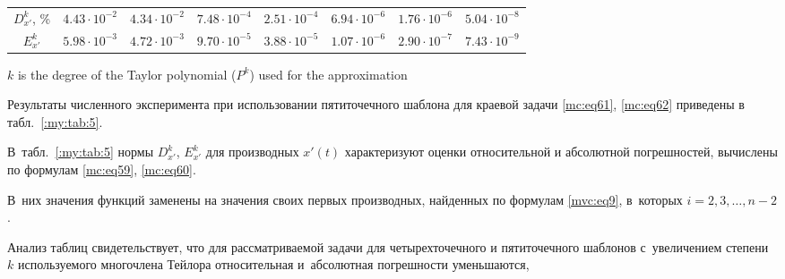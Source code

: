 \begin{table}
\begin{minipage}{.92\textwidth}
\begin{tabular}{c|c|c|c|c|c|c|c}
 \hline

\rule{0mm}{10pt}%


$D_{x'}^k$, \% & $4.43 \cdot {10^{-2}}$ & $4.34 \cdot {10^{-2}}$ & $7.48 \cdot {10^{-4}}$ & $2.51 \cdot {10^{-4}}$   &  $6.94 \cdot {10^{-6}}$ & $1.76 \cdot {10^{-6}}$ & $5.04 \cdot {10^{-8}}$ \\

$E_{x'}^k$  & $5.98 \cdot {10^{-3}}$ & $4.72 \cdot {10^{-3}}$ & $9.70 \cdot {10^{-5}}$ & $3.88 \cdot {10^{-5}}$  & $1.07 \cdot {10^{-6}}$ & $2.90 \cdot {10^{-7}}$ & $7.43 \cdot {10^{-9}}$  \\ 

\hline



\end{tabular}



\vspace{0.2cm}

\footnotesize



$k$ is the degree of the Taylor polynomial ($P^k$) used for the approximation





\end{minipage}





\end{table}







Результаты численного эксперимента при использовании пятиточечного шаблона для краевой задачи \eqref{mc:eq61}, \eqref{mc:eq62} приведены в табл.~\ref{:my:tab:5}.



В~табл.~\ref{:my:tab:5} нормы  $   D_{x'}^k$,    $   E_{x'}^k$  для производных $   x'(t)$  характеризуют  оценки относительной и абсолютной погрешностей, вычислены по формулам \eqref{mc:eq59}, \eqref{mc:eq60}.  

В~них значения функций заменены на значения своих первых производных, найденных по формулам \eqref{mvc:eq9}, в~которых $i=2,  3,  \dots,  n-2$.





Анализ таблиц свидетельствует, что для рассматриваемой задачи для четырехточечного и пятиточечного шаблонов с~увеличением степени $k$ используемого многочлена Тейлора относительная и~абсолютная  погрешности уменьшаются, 

